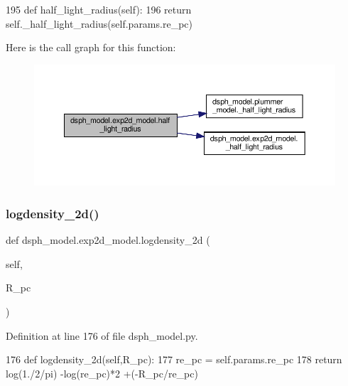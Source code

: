 \begin{DoxyCode}
195     \textcolor{keyword}{def }half\_light\_radius(self):
196         \textcolor{keywordflow}{return} self.\_half\_light\_radius(self.params.re\_pc)
\end{DoxyCode}
Here is the call graph for this function\+:\nopagebreak
\begin{figure}[H]
\begin{center}
\leavevmode
\includegraphics[width=350pt]{df/d3d/classdsph__model_1_1exp2d__model_a477eaae9bad0731911aabdad810c06ee_cgraph}
\end{center}
\end{figure}
\mbox{\label{classdsph__model_1_1exp2d__model_a1652d2c72ea1f7da120a2334985a0386}} 
\subsubsection{\texorpdfstring{logdensity\+\_\+2d()}{logdensity\_2d()}}
{\footnotesize\ttfamily def dsph\+\_\+model.\+exp2d\+\_\+model.\+logdensity\+\_\+2d (\begin{DoxyParamCaption}\item[{}]{self,  }\item[{}]{R\+\_\+pc }\end{DoxyParamCaption})}



Definition at line 176 of file dsph\+\_\+model.\+py.


\begin{DoxyCode}
176     \textcolor{keyword}{def }logdensity\_2d(self,R\_pc):
177         re\_pc = self.params.re\_pc
178         \textcolor{keywordflow}{return} log(1./2/pi) -log(re\_pc)*2 +(-R\_pc/re\_pc) 
\end{DoxyCode}
\mbox{\label{classdsph__model_1_1exp2d__model_af2224092e988940539b872a4fe0afa38}} 
